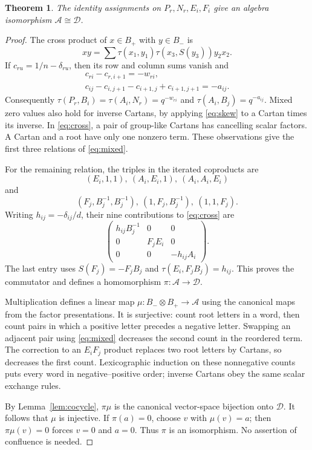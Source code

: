 \documentclass[11pt]{article}
\newtheorem{theorem}{Theorem}[section]
\theoremstyle{definition}
\theoremstyle{remark}
\newcommand{\cA}{\mathcal{A}}
\newcommand{\cD}{\mathcal{D}}
\begin{document}
\begin{theorem}\label{thm:double}
The identity assignments on $P_r,N_r,E_i,F_i$ give an algebra isomorphism $\cA\cong\cD$.
\end{theorem}
\begin{proof}
The cross product of $x\in B_+$ with $y\in B_-$ is
\begin{equation}\label{eq:cross}
 xy=\sum\tau(x_1,y_1)\tau(x_3,S(y_3))y_2x_2.
\end{equation}
If $c_{ru}=1/n-\delta_{ru}$, then its row and column sums vanish and
\[
 \begin{gathered}
 c_{ri}-c_{r,i+1}=-w_{ri},\\
 c_{ij}-c_{i,j+1}-c_{i+1,j}+c_{i+1,j+1}=-a_{ij}.
 \end{gathered}
\]
Consequently $\tau(P_r,B_i)=\tau(A_i,N_r)=q^{-w_{ri}}$ and $\tau(A_i,B_j)=q^{-a_{ij}}$. Mixed zero values also hold for inverse Cartans, by applying \eqref{eq:skew} to a Cartan times its inverse. In \eqref{eq:cross}, a pair of group-like Cartans has cancelling scalar factors. A Cartan and a root have only one nonzero term. These observations give the first three relations of \eqref{eq:mixed}.

For the remaining relation, the triples in the iterated coproducts are
\[
 (E_i,1,1),\ (A_i,E_i,1),\ (A_i,A_i,E_i)
\]
and
\[
 (F_j,B_j^{-1},B_j^{-1}),\ (1,F_j,B_j^{-1}),\ (1,1,F_j).
\]
Writing $h_{ij}=-\delta_{ij}/d$, their nine contributions to \eqref{eq:cross} are
\[
 \begin{pmatrix}
 h_{ij}B_j^{-1}&0&0\\
 0&F_jE_i&0\\
 0&0&-h_{ij}A_i
 \end{pmatrix}.
\]
The last entry uses $S(F_j)=-F_jB_j$ and $\tau(E_i,F_jB_j)=h_{ij}$. This proves the commutator and defines a homomorphism $\pi:\cA\to\cD$.

Multiplication defines a linear map $\mu:B_-\otimes B_+\to\cA$ using the canonical maps from the factor presentations. It is surjective: count root letters in a word, then count pairs in which a positive letter precedes a negative letter. Swapping an adjacent pair using \eqref{eq:mixed} decreases the second count in the reordered term. The correction to an $E_iF_j$ product replaces two root letters by Cartans, so decreases the first count. Lexicographic induction on these nonnegative counts puts every word in negative--positive order; inverse Cartans obey the same scalar exchange rules.

By Lemma~\ref{lem:cocycle}, $\pi\mu$ is the canonical vector-space bijection onto $\cD$. It follows that $\mu$ is injective. If $\pi(a)=0$, choose $v$ with $\mu(v)=a$; then $\pi\mu(v)=0$ forces $v=0$ and $a=0$. Thus $\pi$ is an isomorphism. No assertion of confluence is needed.
\end{proof}
\end{document}
